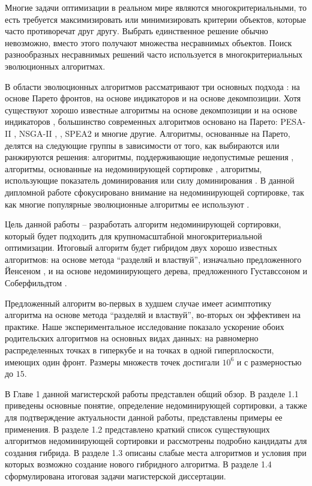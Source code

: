 \startprefacepage

Многие задачи оптимизации в реальном мире являются многокритериальными, то есть требуется максимизировать или минимизировать критерии объектов, которые часто противоречат друг другу. Выбрать единственное решение обычно невозможно, вместо этого получают множества несравнимых объектов. Поиск разнообразных несравнимых решений часто используется в многокритериальных эволюционных алгоритмах.

В области эволюционных алгоритмов рассматривают три основных подхода \cite{Brockhoff}: на основе Парето фронтов, на основе индикаторов и на основе декомпозиции. Хотя существуют хорошо известные алгоритмы на основе декомпозиции \cite{Zhang2007} и на основе индикаторов \cite{Zitzler}, большинство современных алгоритмов основано на Парето: PESA-II \cite{PESA-II}, NSGA-II \cite{NSGA-II}, \cite{Deb2013}, SPEA2 \cite{SPEA2} и многие другие. Алгоритмы, основанные на Парето, делятся на следующие группы в зависимости от того, как выбираются или ранжируются решения: алгоритмы, поддерживающие недопустимые решения \cite{Coello, PESA-II, PAES}, алгоритмы, основанные на недоминирующей сортировке \cite{NSGA-II, Deb2013}, алгоритмы, использующие показатель доминирования \cite{Fonseca} или силу доминирования \cite{SPEA2}. В данной дипломной работе сфокусировано внимание на недоминирующей сортировке, так как многие популярные эволюционные алгоритмы ее используют \cite{NSGA-II, Deb2013}.

Цель данной работы -- разработать алгоритм недоминирующей сортировки, который будет подходить для крупномасштабной многокритериальной оптимизации. Итоговый алгоритм будет гибридом двух хорошо известных алгоритмов: на основе метода ``разделяй и властвуй'', изначально предложенного Йенсеном \cite{Jensen}, и на основе недоминирующего дерева, предложенного Густавссоном и Соберфильдтом \cite{Gustavsson}.

Предложенный алгоритм во-первых в худшем случае имеет асимптотику алгоритма на основе метода ``разделяй и властвуй'', во-вторых он эффективен на практике. Наше экспериментальное исследование показало ускорение обоих родительских алгоритмов на основных видах данных: на равномерно распределенных точках в гиперкубе и на точках в одной гиперплоскости, имеющих один фронт. Размеры множеств точек достигали $10^6$ и с размерностью до $15$.

В Главе 1 данной магистерской работы представлен общий обзор. 
В разделе 1.1 приведены основные понятие, определение недоминирующей сортировки, а также для подтверждение актуальности данной работы, представлены примеры ее применения. 
В разделе 1.2 представлено краткий список существующих алгоритмов недоминирующей сортировки и рассмотрены подробно кандидаты для создания гибрида. 
В разделе 1.3 описаны слабые места алгоритмов и условия при которых возможно создание нового гибридного алгоритма. 
В разделе 1.4 сформулирована итоговая задачи магистерской диссертации.

